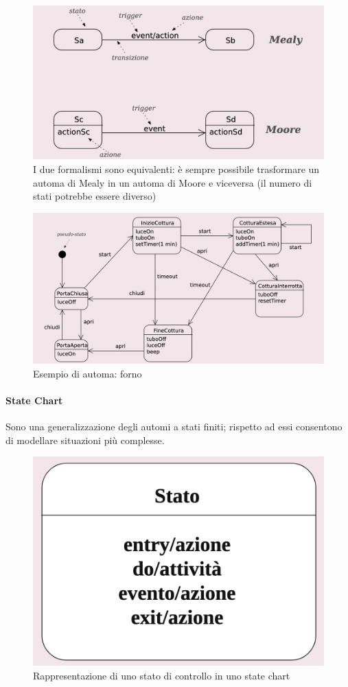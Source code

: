\begin{figure}[H]
    \centering
    \includegraphics[width=0.8\linewidth]{assets/UML/state/state1.png}
    \caption{I due formalismi sono equivalenti: è sempre possibile trasformare un automa di Mealy in un automa di Moore e viceversa (il numero di stati potrebbe essere diverso)}
\end{figure}

\begin{figure}[H]
    \centering
    \includegraphics[width=1\linewidth]{assets/UML/state/state2.png}
    \caption{Esempio di automa: forno}
\end{figure}

\paragraph{State Chart} Sono una generalizzazione degli automi a stati finiti; rispetto ad essi consentono di modellare situazioni più complesse.

\begin{figure}[H]
    \centering
    \includegraphics[width=0.25\linewidth]{assets/UML/state/state3.png}
    \caption{Rappresentazione di uno stato di controllo in uno state chart}
\end{figure}

